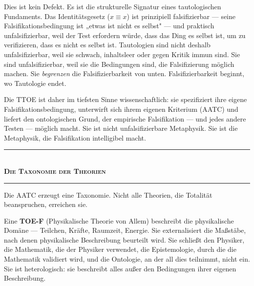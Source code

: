 \documentclass[10pt, openany, oneside]{book}
\renewcommand{\normalsize}{\fontsize{10}{13}\selectfont}
\begin{document}
\vspace{0.8em}

\noindent Dies ist kein Defekt. Es ist die strukturelle Signatur eines tautologischen Fundaments. Das Identitätsgesetz ($x \equiv x$) ist prinzipiell falsifizierbar --- seine Falsifikationsbedingung ist „etwas ist nicht es selbst" --- und praktisch unfalsifizierbar, weil der Test erfordern würde, dass das Ding es selbst ist, um zu verifizieren, dass es nicht es selbst ist. Tautologien sind nicht deshalb unfalsifizierbar, weil sie schwach, inhaltsleer oder gegen Kritik immun sind. Sie sind unfalsifizierbar, weil sie die Bedingungen sind, die Falsifizierung möglich machen. Sie \textit{begrenzen} die Falsifizierbarkeit von unten. Falsifizierbarkeit beginnt, wo Tautologie endet.

Die TTOE ist daher im tiefsten Sinne wissenschaftlich: sie spezifiziert ihre eigene Falsifikationsbedingung, unterwirft sich ihrem eigenen Kriterium (AATC) und liefert den ontologischen Grund, der empirische Falsifikation --- und jedes andere Testen --- möglich macht. Sie ist nicht unfalsifizierbare Metaphysik. Sie ist die Metaphysik, die Falsifikation intelligibel macht.

\vspace{1.5em}


\begin{center}
    \rule{0.3\textwidth}{0.4pt}\\[0.5em]
    {\normalsize\bfseries\scshape Die Taxonomie der Theorien}\\[0.3em]
    \rule{0.3\textwidth}{0.4pt}
\end{center}

\vspace{1em}

\noindent Die AATC erzeugt eine Taxonomie. Nicht alle Theorien, die Totalität beanspruchen, erreichen sie.

Eine \textbf{TOE-F} (Physikalische Theorie von Allem) beschreibt die physikalische Domäne --- Teilchen, Kräfte, Raumzeit, Energie. Sie externalisiert die Maßstäbe, nach denen physikalische Beschreibung beurteilt wird. Sie schließt den Physiker, die Mathematik, die der Physiker verwendet, die Epistemologie, durch die die Mathematik validiert wird, und die Ontologie, an der all dies teilnimmt, nicht ein. Sie ist heterologisch: sie beschreibt alles außer den Bedingungen ihrer eigenen Beschreibung.
\end{document}
